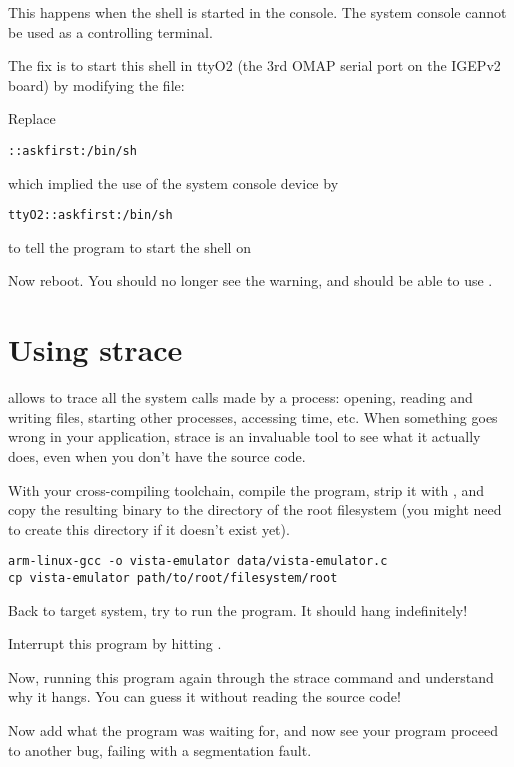 This happens when the shell is started in the console. The system
console cannot be used as a controlling terminal.

The fix is to start this shell in ttyO2 (the 3rd OMAP serial port on
the IGEPv2 board) by modifying the  file:

Replace
\begin{verbatim}
::askfirst:/bin/sh
\end{verbatim}
which implied the use of the system console device by
\begin{verbatim}
ttyO2::askfirst:/bin/sh
\end{verbatim}
to tell the  program to start the shell on 

Now reboot. You should no longer see the 
warning, and should be able to use \code{[Ctrl] [C]}.

\section{Using strace}

 allows to trace all the system calls made by a process:
opening, reading and writing files, starting other processes,
accessing time, etc. When something goes wrong in your application,
strace is an invaluable tool to see what it actually does, even when
you don't have the source code.

With your cross-compiling toolchain, compile the
 program, strip it with ,
and copy the resulting binary to
the  directory of the root filesystem (you might need to create
this directory if it doesn't exist yet).

\begin{verbatim}
arm-linux-gcc -o vista-emulator data/vista-emulator.c
cp vista-emulator path/to/root/filesystem/root
\end{verbatim}

Back to target system, try to run the 
program. It should hang indefinitely!

Interrupt this program by hitting \code{[Ctrl] [C]}.

Now, running this program again through the strace command and
understand why it hangs. You can guess it without reading the source
code!

Now add what the program was waiting for, and now see your program
proceed to another bug, failing with a segmentation fault.

